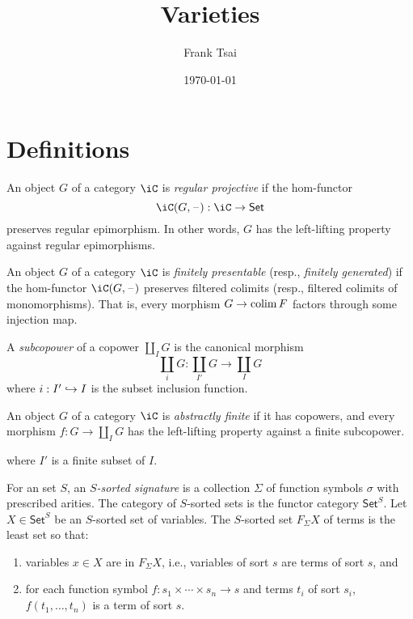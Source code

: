 \documentclass{amsart}
\title{Varieties}
\author{Frank Tsai}
\date{\today}
\begin{document}
\maketitle
\tableofcontents

\section{Definitions}
\label{sec:definitions}

\begin{defn}
  An object $G$ of a category $\iC$ is \emph{regular projective} if the hom-functor
  \[
    \iC(G,\blank) : \iC \to \mathsf{Set}
  \]
  preserves regular epimorphism.
  In other words, $G$ has the left-lifting property against regular epimorphisms.
  
\end{defn}

\begin{defn}
  An object $G$ of a category $\iC$ is \emph{finitely presentable} (resp., \emph{finitely generated}) if the hom-functor $\iC(G,\blank)$ preserves filtered colimits (resp., filtered colimits of monomorphisms).
  That is, every morphism $G \to \operatorname{colim} F$ factors through some injection map.
  
\end{defn}

\begin{defn}
  A \emph{subcopower} of a copower $\coprod_{I}G$ is the canonical morphism
  \[
    \coprod_{i}G : \coprod_{I'}G \to \coprod_{I}G
  \]
  where $i : I' \hookrightarrow I$ is the subset inclusion function.
\end{defn}

\begin{defn}
  An object $G$ of a category $\iC$ is \emph{abstractly finite} if it has copowers, and every morphism $f : G \to \coprod_{I}G$ has the left-lifting property against a finite subcopower.
  
  where $I'$ is a finite subset of $I$.
\end{defn}

\begin{defn}
  For an set $S$, an \emph{$S$-sorted signature} is a collection $\Sigma$ of function symbols $\sigma$ with prescribed arities.
  The category of $S$-sorted sets is the functor category $\mathsf{Set}^{S}$.
  Let $X \in \mathsf{Set}^{S}$ be an $S$-sorted set of variables.
  The $S$-sorted set $F_{\Sigma}X$ of terms is the least set so that:
  \begin{enumerate}
  \item variables $x \in X$ are in $F_{\Sigma}X$, i.e., variables of sort $s$ are terms of sort $s$, and
  \item for each function symbol $f : s_{1} \times \cdots \times s_{n} \to s$ and terms $t_{i}$ of sort $s_{i}$, $f(t_{1},\ldots,t_{n})$ is a term of sort $s$.
  \end{enumerate}
\end{defn}
\end{document}
